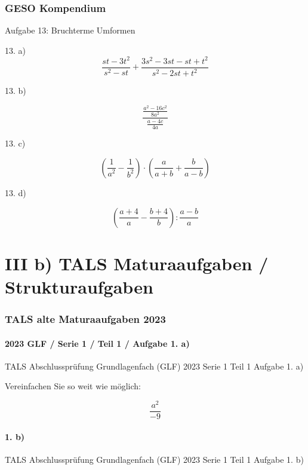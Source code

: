 {\section*{GESO Kompendium}

Aufgabe 13: Bruchterme Umformen

13. a)
$$\frac{st-3t^2}{s^2-st} + \frac{3s^2-3st-st+t^2}{s^2-2st+t^2}$$


13. b)

$$\frac{\frac{a^2-16c^2}{8a^2}}{\frac{a-4c}{4a}}$$


13. c)

$$\left(\frac1{a^2} - \frac1{b^2} \right) \cdot{} \left( \frac{a}{a+b} + \frac{b}{a-b}\right)$$


13. d)

$$\left(\frac{a+4}a - \frac{b+4}b \right) : \frac{a-b}a$$



\newpage
\part*{III b) TALS Maturaaufgaben / Strukturaufgaben}

\section*{TALS alte Maturaaufgaben 2023}
\subsection*{2023 GLF / Serie 1 / Teil 1 / Aufgabe 1. a)}
TALS Abschlussprüfung Grundlagenfach (GLF) 2023 Serie 1 Teil 1 Aufgabe
1. a)

Vereinfachen Sie so weit wie möglich:

$$\frac{a^2}{-9}$$


\subsection*{1. b)}
TALS Abschlussprüfung Grundlagenfach (GLF) 2023 Serie 1 Teil 1 Aufgabe
1. b)

}
